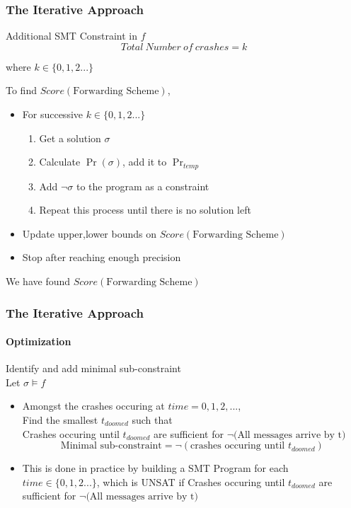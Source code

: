 \documentclass{beamer}
\begin{document}
\begin{frame}
\frametitle{The Iterative Approach}
	\begin{block}{Additional SMT Constraint in $f$}
	\begin{equation}
		Total\ Number\ of\ crashes = k
	\end{equation}
	\begin{flushright}
		where $k\in\{0,1,2...\}$
	\end{flushright}
	\end{block}
	\pause
	To find $Score(\text{Forwarding Scheme})$,\\
	\begin{itemize}
	\item For successive $k\in\{0,1,2...\}$
	\begin{enumerate}
		\item Get a solution $\sigma$
		\item Calculate $\Pr(\sigma)$, add it to $\Pr _{temp}$
		\item Add $\neg \sigma$ to the program as a constraint
		\item Repeat this process until there is no solution left
	\end{enumerate}
	\item Update upper,lower bounds on $Score(\text{Forwarding Scheme})$
	\item Stop after reaching enough precision
	\end{itemize}
	We have found $Score(\text{Forwarding Scheme})$
\end{frame}

\begin{frame}
\frametitle{The Iterative Approach}
\framesubtitle{Optimization}
	Identify and add minimal sub-constraint\\[2ex]
	Let $ \sigma \vDash f$\\
	\begin{itemize}
	\item Amongst the crashes occuring at $time=0,1,2,...$,\\
	Find the smallest $t_{doomed}$ such that\\
	Crashes occuring until $t_{doomed}$ are sufficient for $\neg\text{(All messages arrive by t)}$\\
	$$\text{Minimal sub-constraint} = \neg(\text{crashes occuring until }t_{doomed})$$
	\item This is done in practice by building a SMT Program for each $time\in\{0,1,2...\}$, which is UNSAT if Crashes occuring until $t_{doomed}$ are sufficient for $\neg\text{(All messages arrive by t)}$
	\end{itemize}
\end{frame}
\end{document}
